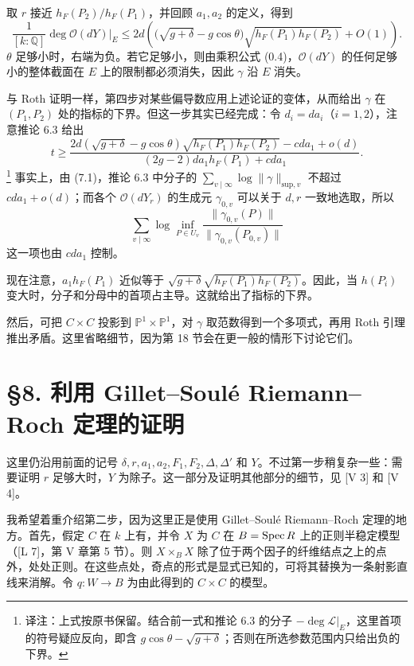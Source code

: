 取 $r$ 接近 $h_F(P_2)/h_F(P_1)$，并回顾 $a_1,a_2$ 的定义，得到
\[
\frac1{[k:\mathbb Q]}\deg\mathcal O(dY)|_E
\le2d\left(\bigl(\sqrt{g+\delta}-g\cos\theta\bigr)
\sqrt{h_F(P_1)h_F(P_2)}+O(1)\right).
\]
$\theta$ 足够小时，右端为负。若它足够小，则由乘积公式 (0.4)，$\mathcal O(dY)$ 的任何足够小的整体截面在 $E$ 上的限制都必须消失，因此 $\gamma$ 沿 $E$ 消失。

与 Roth 证明一样，第四步对某些偏导数应用上述论证的变体，从而给出 $\gamma$ 在 $(P_1,P_2)$ 处的指标的下界。但这一步其实已经完成：令 $d_i=da_i$（$i=1,2$），注意推论 6.3 给出
\[
t\ge
\frac{2d(\sqrt{g+\delta}-g\cos\theta)\sqrt{h_F(P_1)h_F(P_2)}-cda_1+o(d)}
{(2g-2)da_1h_F(P_1)+cda_1}.
\]
\footnote{译注：上式按原书保留。结合前一式和推论 6.3 的分子 $-\deg\mathscr L|_E$，这里首项的符号疑应反向，即含 $g\cos\theta-\sqrt{g+\delta}$；否则在所选参数范围内只给出负的下界。}
事实上，由 (7.1)，推论 6.3 中分子的 $\sum_{v\mid\infty}\log\|\gamma\|_{\mathrm{sup},v}$ 不超过 $cda_1+o(d)$；而各个 $\mathcal O(dY_r)$ 的生成元 $\gamma_{0,v}$ 可以关于 $d,r$ 一致地选取，所以
\[
\sum_{v\mid\infty}\log\inf_{P\in U_v}
\frac{\|\gamma_{0,v}(P)\|}{\|\gamma_{0,v}(P_{0,v})\|}
\]
这一项也由 $cda_1$ 控制。

现在注意，$a_1h_F(P_1)$ 近似等于 $\sqrt{g+\delta}\sqrt{h_F(P_1)h_F(P_2)}$。因此，当 $h(P_i)$ 变大时，分子和分母中的首项占主导。这就给出了指标的下界。

然后，可把 $C\times C$ 投影到 $\mathbb P^1\times\mathbb P^1$，对 $\gamma$ 取范数得到一个多项式，再用 Roth 引理推出矛盾。这里省略细节，因为第 18 节会在更一般的情形下讨论它们。

\section*{§8. 利用 Gillet--Soulé Riemann--Roch 定理的证明}
这里仍沿用前面的记号 $\delta,r,a_1,a_2,F_1,F_2,\Delta,\Delta'$ 和 $Y$。不过第一步稍复杂一些：需要证明 $r$ 足够大时，$Y$ 为除子。这一部分及证明其他部分的细节，见 [V 3] 和 [V 4]。

我希望着重介绍第二步，因为这里正是使用 Gillet--Soulé Riemann--Roch 定理的地方。首先，假定 $C$ 在 $k$ 上有，并令 $X$ 为 $C$ 在 $B=\operatorname{Spec} R$ 上的正则半稳定模型（[L 7]，第 V 章第 5 节）。则 $X\times_BX$ 除了位于两个因子的纤维结点之上的点外，处处正则。在这些点处，奇点的形式是显式已知的，可将其替换为一条射影直线来消解。令 $q:W\to B$ 为由此得到的 $C\times C$ 的模型。

